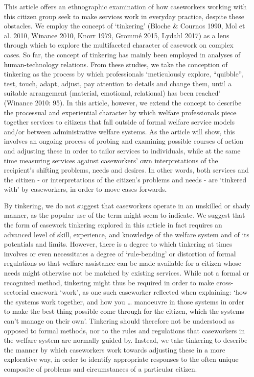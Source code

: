 \par
This article offers an ethnographic examination of how caseworkers working with this citizen group seek to make services work in everyday practice, despite these obstacles. We employ the concept of ‘tinkering’ (Bloche \& Cournos 1990, Mol et al. 2010, Winance 2010, Knorr 1979, Grommé 2015, Lydahl 2017) as a lens through which to explore the multifaceted character of casework on complex cases. So far, the concept of tinkering has mainly been employed in analyses of human-technology relations. From these studies, we take the conception of tinkering as the process by which professionals ‘meticulously explore, “quibble”, test, touch, adapt, adjust, pay attention to details and change them, until a suitable arrangement (material, emotional, relational) has been reached’ (Winance 2010: 95). In this article, however, we extend the concept to describe the processual and experiential character by which welfare professionals piece together services to citizens that fall outside of formal welfare service models and/or between administrative welfare systems. As the article will show, this involves an ongoing process of probing and examining possible courses of action and adjusting these in order to tailor services to individuals, while at the same time measuring services against caseworkers’ own interpretations of the recipient’s shifting problems, needs and desires. In other words, both services and the citizen - or interpretations of the citizen’s problems and needs - are ‘tinkered with’ by caseworkers, in order to move cases forwards.
\par
By tinkering, we do not suggest that caseworkers operate in an unskilled or shady manner, as the popular use of the term might seem to indicate. We suggest that the form of casework tinkering explored in this article in fact requires an advanced level of skill, experience, and knowledge of the welfare system and of its potentials and limits. However, there is a degree to which tinkering at times involves or even necessitates a degree of ‘rule-bending’ or distortion of formal regulations so that welfare assistance can be made available for a citizen whose needs might otherwise not be matched by existing services. While not a formal or recognized method, tinkering might thus be required in order to make cross-sectorial casework ‘work’, as one such caseworker reflected when explaining: ‘how the systems work together, and how you … manoeuvre in those systems in order to make the best thing possible come through for the citizen, which the systems can’t manage on their own’. Tinkering should therefore not be understood as opposed to formal methods, nor to the rules and regulations that caseworkers in the welfare system are normally guided by. Instead, we take tinkering to describe the manner by which caseworkers work towards adjusting these in a more explorative way, in order to identify appropriate responses to the often unique composite of problems and circumstances of a particular citizen.

